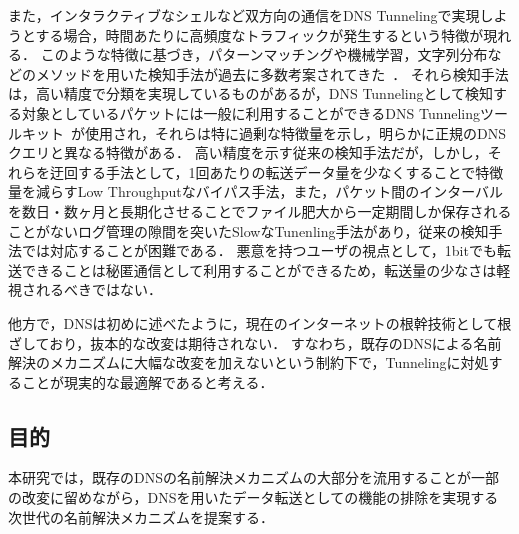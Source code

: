 
また，インタラクティブなシェルなど双方向の通信をDNS Tunnelingで実現しようとする場合，時間あたりに高頻度なトラフィックが発生するという特徴が現れる．
このような特徴に基づき，パターンマッチングや機械学習，文字列分布などのメソッドを用いた検知手法が過去に多数考案されてきた~\cite{born, cheng, liu, asaf, steadman, jawad}．
それら検知手法は，高い精度で分類を実現しているものがあるが，DNS Tunnelingとして検知する対象としているパケットには一般に利用することができるDNS Tunnelingツールキット~\cite{ozymandns, iodine, dnscat2}が使用され，それらは特に過剰な特徴量を示し，明らかに正規のDNSクエリと異なる特徴がある．
高い精度を示す従来の検知手法だが，しかし，それらを迂回する手法として，1回あたりの転送データ量を少なくすることで特徴量を減らすLow Throughputなバイパス手法，また，パケット間のインターバルを数日・数ヶ月と長期化させることでファイル肥大から一定期間しか保存されることがないログ管理の隙間を突いたSlowなTunenling手法があり，従来の検知手法では対応することが困難である．
悪意を持つユーザの視点として，1bitでも転送できることは秘匿通信として利用することができるため，転送量の少なさは軽視されるべきではない．

他方で，DNSは初めに述べたように，現在のインターネットの根幹技術として根ざしており，抜本的な改変は期待されない．
すなわち，既存のDNSによる名前解決のメカニズムに大幅な改変を加えないという制約下で，Tunnelingに対処することが現実的な最適解であると考える．


\subsection{目的}
本研究では，既存のDNSの名前解決メカニズムの大部分を流用することが一部の改変に留めながら，DNSを用いたデータ転送としての機能の排除を実現する次世代の名前解決メカニズムを提案する．




